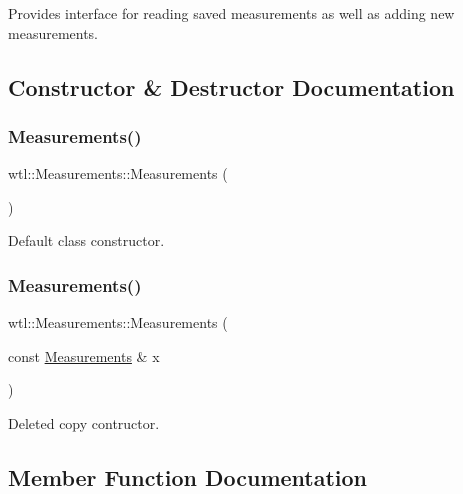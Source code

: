 Provides interface for reading saved measurements as well as adding new measurements. 

\subsection{Constructor \& Destructor Documentation}
\mbox{\label{classwtl_1_1_measurements_acb3ccc3f9a1a8322f80a8ff7891fec07}} 
\subsubsection{\texorpdfstring{Measurements()}{Measurements()}\hspace{0.1cm}{\footnotesize\ttfamily [1/2]}}
{\footnotesize\ttfamily wtl\+::\+Measurements\+::\+Measurements (\begin{DoxyParamCaption}{ }\end{DoxyParamCaption})\hspace{0.3cm}{\ttfamily [default]}}



Default class constructor. 

\mbox{\label{classwtl_1_1_measurements_a01e5d71f0613863ff9b156a7f420880a}} 
\subsubsection{\texorpdfstring{Measurements()}{Measurements()}\hspace{0.1cm}{\footnotesize\ttfamily [2/2]}}
{\footnotesize\ttfamily wtl\+::\+Measurements\+::\+Measurements (\begin{DoxyParamCaption}\item[{const \hyperlink{classwtl_1_1_measurements}{Measurements} \&}]{x }\end{DoxyParamCaption})\hspace{0.3cm}{\ttfamily [delete]}}



Deleted copy contructor. 



\subsection{Member Function Documentation}
\mbox{\label{classwtl_1_1_measurements_a0e01de8663026fb293a904635f234745}} 
